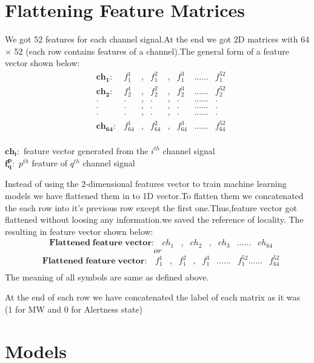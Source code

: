 \section{Flattening Feature Matrices}
We got 52 features for each channel signal.At the end we got 2D matrices with 64 $\times$ 52  (each row contains features of a  channel).The general form of a feature vector shown below:
\begin{align*}
&\boldsymbol{ch_1:} &f_1^1&,&f_1^2&,&f_1^3 &......    &f_1^{52} \\
&\boldsymbol{ch_2:} &f_2^1&,&f_2^2&,&f_2^3 &......   &f_2^{52} \\
&  \boldsymbol{.}       &.   &,  &. &, &.    &......   &.      \\
&  \boldsymbol{.}       &.   &,  &. &, &.    &......   &.      \\
&  \boldsymbol{.}       &.   &,  &. &, &.    &......   &.   \\
&\boldsymbol{ch_{64}:} &f_{64}^1&,&f_{64}^2&,&f_{64}^3 &......&f_{64}^{52} \\
\end{align*}

$\boldsymbol{ch_i :}$ feature  vector generated from the $i^{th}$ channel signal \\
$\boldsymbol{f_q^p :}$ $p^{th}$ feature of $q^{th}$ channel signal

Instead of using the 2-dimensional features vector to train machine learning models we have flattened them in to 1D vector.To flatten them we concatenated the each row into it's previous row except the first one.Thus,feature vector got flattened without loosing any information.we saved the reference of locality. 
The resulting in feature vector shown below:
\begin{align*}
    &\boldsymbol{Flattened \; feature \; vector:} &ch_1&,&ch_2&,&ch_3 &...... &ch_{64}
\end{align*}
$$or$$
\begin{align*}
&\boldsymbol{Flattened \; feature \; vector:} &f_1^1&,&f_1^2&,&f_1^3 &......    &f_1^{52}......&f_{64}^{52} \\
\end{align*}
The meaning of all symbols are same as defined above.

At the end of each row we have concatenated the label of each matrix as it was (1 for MW and 0 for Alertness state)
\section{Models}

